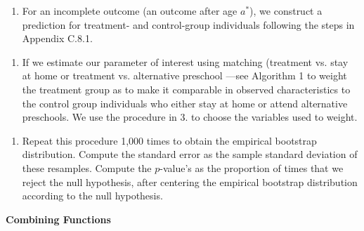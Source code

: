 \documentclass[static]{JJH-Beamer}
\begin{document}
\begin{frame}

\begin{enumerate}[5.]
\item For an incomplete outcome (an outcome after age $a^*$), we construct a prediction for treatment- and control-group individuals following the steps in Appendix C.8.1.
\end{enumerate}

\end{frame}

\begin{frame}

\begin{enumerate}[6.]
\item If we estimate our parameter of interest using  matching (treatment vs. stay at home or treatment vs. alternative preschool ---see Algorithm 1 to weight the treatment group as to make it comparable in observed characteristics to the control group individuals who either stay at home or attend alternative preschools. We use the procedure in 3. to choose the variables used to weight.
\end{enumerate}

\end{frame}

\begin{frame}

\begin{enumerate}[7.]
\item Repeat this procedure 1,000 times to obtain the empirical bootstrap distribution. Compute the standard error as the sample standard deviation of these resamples. Compute the $p$-value's as the proportion of times that we reject the null hypothesis, after centering the empirical bootstrap distribution according to the null hypothesis.
\end{enumerate}

\end{frame}

\clearpage

\begin{frame}

\begin{center}
\textbf{Combining Functions}
\end{center}

\end{frame}
\end{document}
